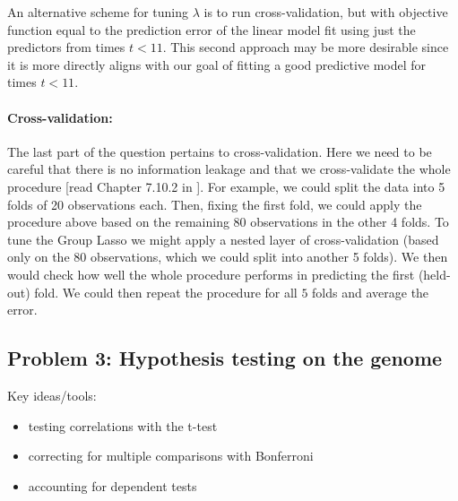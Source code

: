 An alternative scheme for tuning $\lambda$ is to run cross-validation, but with objective function equal to the prediction error of the linear model fit using just the predictors from times $t<11$. This second approach may be more desirable since it is more directly aligns with our goal of fitting a good predictive model for times $t<11$.


\paragraph{Cross-validation:} The last part of the question pertains to cross-validation. Here we need to be careful that there is no information leakage and that we cross-validate the whole procedure [read Chapter 7.10.2 in \citep*{hastie2009elements}]. For example, we could split the data into 5 folds of 20 observations each. Then, fixing the first fold, we could apply the procedure above based on the remaining 80 observations in the other 4 folds. To tune the Group Lasso we might apply a nested layer of cross-validation (based only on the 80 observations, which we could split into another 5 folds). We then would check how well the whole procedure performs in predicting the first (held-out) fold. We could then repeat the procedure for all $5$ folds and average the error.

\subsection*{Problem 3: Hypothesis testing on the genome}
Key ideas/tools:
\begin{itemize}
  \item testing correlations with the t-test
  \item correcting for multiple comparisons with Bonferroni
  \item accounting for dependent tests
\end{itemize}

